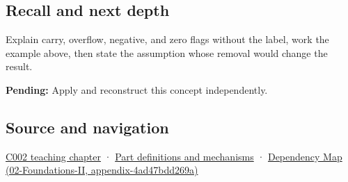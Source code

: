 \subsection{Recall and next depth}\label{recall-and-next-depth}

Explain carry, overflow, negative, and zero flags without the label, work the example above, then state the assumption whose removal would change the result.

\textbf{Pending:} Apply and reconstruct this concept independently.

\subsection{Source and navigation}\label{source-and-navigation}

\href{Continuous\%20Notes/Computing\%20Foundations\%20-\%20From\%20Bits\%20to\%20C++\%20and\%20Systems\%20APIs\#Arithmetic\%20becomes\%20a\%20policy}{C002 teaching chapter} · \hyperref[appendix-fd090d982a15]{Part definitions and mechanisms} · \href{}{Dependency Map (02-Foundations-II, appendix-4ad47bdd269a)}
